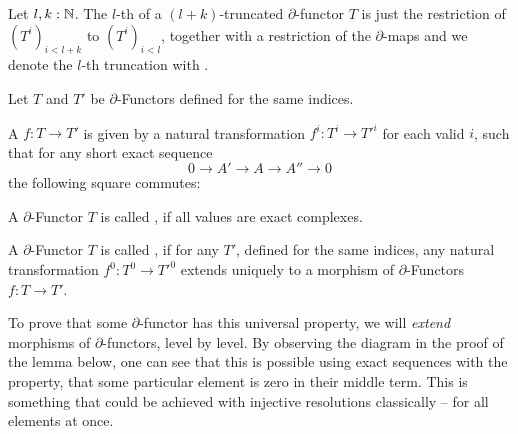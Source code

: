 \begin{definition}
  Let $l,k:\mathbb{N}$.
  The $l$-th  of a $(l+k)$-truncated $\partial$-functor $T$
  is just the restriction of $(T^i)_{i<l+k}$ to $(T^i)_{i<l}$, together with a restriction of the $\partial$-maps
  and we denote the $l$-th truncation with .
\end{definition}

\begin{definition}
  Let $T$ and $T'$ be $\partial$-Functors defined for the same indices.
  
  A  $f:T\to T'$ is given by a natural transformation $f^i:T^i\to T'^i$ for each valid $i$,
  such that for any short exact sequence
  \[ 0\to A'\to A\to A''\to 0\]
  the following square commutes:
  \begin{center}
  \end{center}
\end{definition}

\begin{definition}
  A $\partial$-Functor $T$ is called ,
  if all values are exact complexes.
\end{definition}

\begin{definition}
  A $\partial$-Functor $T$ is called , if for any $T'$, defined for the same indices,
  any natural transformation $f^0:T^0\to T'^0$ extends uniquely to a morphism of $\partial$-Functors $f:T\to T'$.
\end{definition}

To prove that some $\partial$-functor has this universal property,
we will \emph{extend} morphisms of $\partial$-functors, level by level.
By observing the diagram in the proof of the lemma below,
one can see that this is possible using exact sequences with the property,
that some particular element is zero in their middle term.
This is something that could be achieved with injective resolutions classically -- for all elements at once.

